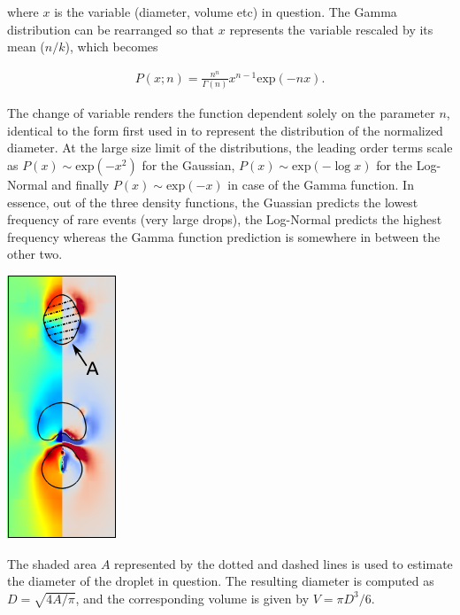 where $x$ is the variable (diameter, volume etc) in question. 
The Gamma distribution can be rearranged so that $x$ represents
the variable rescaled by its mean ($n / k$), which becomes 

\begin{align}
	P\left( x ; n \right) = \frac{n^{n}}{\Gamma(n)} x^{n-1} \textrm{exp}\left(-n x\right) . 
\end{align}

The change of variable renders the function dependent solely 
on the parameter $n$, identical to the form first used in \cite{vill_2}
to represent the distribution of the normalized diameter.  
At the large size limit of the distributions, the leading order terms 
scale as $P(x) \sim \textrm{exp}(-x^2)$ for the Gaussian, $P(x) \sim \textrm{exp}(- \log x)$ for 
the Log-Normal and finally $P(x) \sim \textrm{exp}(- x)$ in case of the Gamma function. 
In essence, out of the three density functions, the Guassian predicts the lowest frequency of
rare events (very large drops), the Log-Normal predicts the highest frequency whereas
the Gamma function prediction is somewhere in between the other two. 

\begin{marginfigure}[-1cm]
\centering
\includegraphics{plots/drop_stats/diameter_compute.pdf}
\caption{The shaded area $A$ represented by the dotted and dashed lines
	is used to estimate the diameter of the droplet in question.
	The resulting diameter is computed as $D = \sqrt{4A/\pi}$,
	and the corresponding volume is given by $V = \pi D^3/6$.
	} 
\label{dia_compute}
\end{marginfigure}

